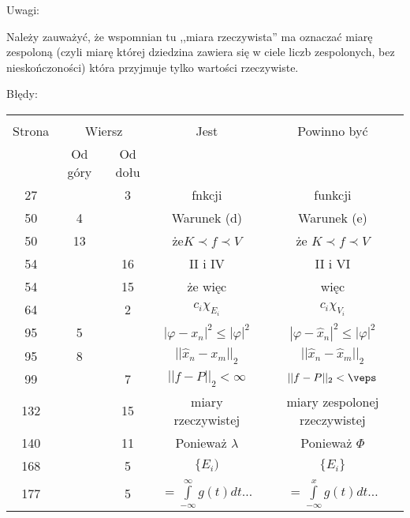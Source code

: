 Uwagi:

\start {} Należy zauważyć, że wspomnian tu ,,miara
rzeczywista'' ma oznaczać miarę zespoloną (czyli miarę której
dziedzina zawiera się w ciele liczb zespolonych, bez nieskończoności)
która przyjmuje tylko wartości rzeczywiste.



Błędy:\\
\begin{center}
  \begin{tabular}{|c|c|c|c|c|}
    \hline
    & \multicolumn{2}{c|}{} & & \\
    Strona & \multicolumn{2}{c|}{Wiersz} & Jest
                              & Powinno być \\ \cline{2-3}
    & Od góry & Od dołu & & \\
    \hline
    27  & &  3 & fnkcji & funkcji \\
    50  &  4 &  & Warunek (d) & Warunek (e) \\
    50  & 13 &  & że$K \prec f  \prec V$ & że $K \prec f  \prec V$ \\
    54  & & 16 & II i IV & II i VI \\
    54  & & 15 & że więc & więc \\
    64  & &  2 & $c_{ i } \chi_{ E_{ i } }$ & $c_{ i } \chi_{ V_{ i } }$ \\
    95  &  5 & & $| \varphi - x_{ n } |^{ 2 } \leq | \varphi |^{ 2 }$
           & $| \varphi - \hat{ x }_{ n } |^{ 2 } \leq | \varphi |^{ 2 }$ \\
    95  &  8 & & $|| \hat{ x }_{ n } - x_{ m }||_{ 2 }$
           & $|| \hat{ x }_{ n } - \hat{ x }_{ m }||_{ 2 }$ \\
    99  & &  7 & $|| f - P ||_{ 2 } < \infty$
           & $|| f - P ||_{ 2 } < \veps$ \\
    132 &  & 15 & miary rzeczywistej & miary zespolonej rzeczywistej \\
    140 & & 11 & Ponieważ $\lambda$ & Ponieważ $\Phi$ \\
    168 & &  5 & $\{ E_{ i } )$ & $\{ E_{ i } \}$ \\
    177 & &  5 & $= \int\limits^{ \infty }_{ -\infty } g( t ) dt \ldots$
           & $= \int\limits^{ x }_{ -\infty } g( t ) dt \ldots$ \\
    \hline
  \end{tabular}
\end{center}


